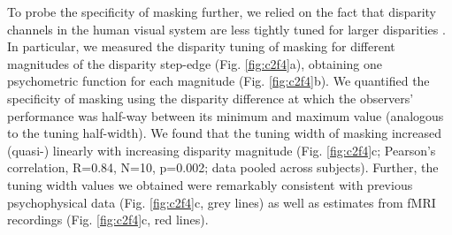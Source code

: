 To probe the specificity of masking further, we relied on the fact that disparity channels in the human visual system are less tightly tuned for larger disparities \cite{TYLER:1975fu,Badcock:1985ly,Lehky:1990fk,Stevenson:1992kx}. In particular, we measured the disparity tuning of masking for different magnitudes of the disparity step-edge (Fig. \ref{fig:c2f4}a), obtaining one psychometric function for each magnitude (Fig. \ref{fig:c2f4}b). We quantified the specificity of masking using the disparity difference at which the observers' performance was half-way between its minimum and maximum value (analogous to the tuning half-width). We found that the tuning width of masking increased (quasi-) linearly with increasing disparity magnitude (Fig. \ref{fig:c2f4}c; Pearson's correlation, R=0.84, N=10, p=0.002; data pooled across subjects). Further, the tuning width values we obtained were remarkably consistent with previous psychophysical data \cite{Stevenson:1992kx} (Fig. \ref{fig:c2f4}c, grey lines) as well as estimates from fMRI recordings \cite{Goncalves:2015aa} (Fig. \ref{fig:c2f4}c, red lines). 


